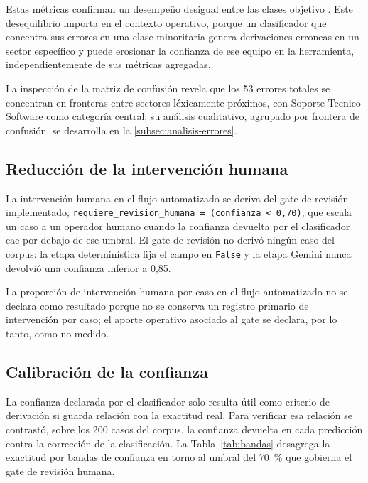 Estas métricas confirman un desempeño desigual entre las clases objetivo \parencite{Sokolova2009_performance_measures}. Este desequilibrio importa en el contexto operativo, porque un clasificador que concentra sus errores en una clase minoritaria genera derivaciones erroneas en un sector específico y puede erosionar la confianza de ese equipo en la herramienta, independientemente de sus métricas agregadas.

La inspección de la matriz de confusión revela que los 53 errores totales se concentran en fronteras entre sectores léxicamente próximos, con Soporte Tecnico Software como categoría central; su análisis cualitativo, agrupado por frontera de confusión, se desarrolla en la \autoref{subsec:analisis-errores}.

\subsection{Reducción de la intervención humana}\label{subsec:reduccion-intervencion}

La intervención humana en el flujo automatizado se deriva del gate de revisión implementado, \texttt{requiere\_revision\_humana = (confianza < 0,70)}, que escala un caso a un operador humano cuando la confianza devuelta por el clasificador cae por debajo de ese umbral. El gate de revisión no derivó ningún caso del corpus: la etapa determinística fija el campo en \texttt{False} y la etapa Gemini nunca devolvió una confianza inferior a 0,85.

La proporción de intervención humana por caso en el flujo automatizado no se declara como resultado porque no se conserva un registro primario de intervención por caso; el aporte operativo asociado al gate se declara, por lo tanto, como no medido.

\subsection{Calibración de la confianza}
\label{subsec:calibracion}

La confianza declarada por el clasificador solo resulta útil como criterio de derivación si guarda relación con la exactitud real. Para verificar esa relación se contrastó, sobre los 200 casos del corpus, la confianza devuelta en cada predicción contra la corrección de la clasificación. La Tabla~\ref{tab:bandas} desagrega la exactitud por bandas de confianza en torno al umbral del 70~\% que gobierna el gate de revisión humana.


